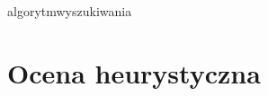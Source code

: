 \newpage
algorytmwyszukiwania
\newpage
\section{Ocena heurystyczna}
\label{sec:ocena-heurystyczna}


